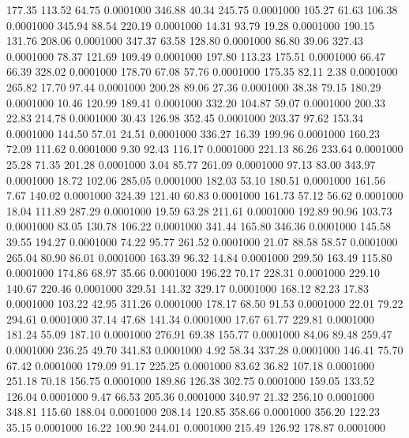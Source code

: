  177.35  113.52   64.75   0.0001000
 346.88   40.34  245.75   0.0001000
 105.27   61.63  106.38   0.0001000
 345.94   88.54  220.19   0.0001000
  14.31   93.79   19.28   0.0001000
 190.15  131.76  208.06   0.0001000
 347.37   63.58  128.80   0.0001000
  86.80   39.06  327.43   0.0001000
  78.37  121.69  109.49   0.0001000
 197.80  113.23  175.51   0.0001000
  66.47   66.39  328.02   0.0001000
 178.70   67.08   57.76   0.0001000
 175.35   82.11    2.38   0.0001000
 265.82   17.70   97.44   0.0001000
 200.28   89.06   27.36   0.0001000
  38.38   79.15  180.29   0.0001000
  10.46  120.99  189.41   0.0001000
 332.20  104.87   59.07   0.0001000
 200.33   22.83  214.78   0.0001000
  30.43  126.98  352.45   0.0001000
 203.37   97.62  153.34   0.0001000
 144.50   57.01   24.51   0.0001000
 336.27   16.39  199.96   0.0001000
 160.23   72.09  111.62   0.0001000
   9.30   92.43  116.17   0.0001000
 221.13   86.26  233.64   0.0001000
  25.28   71.35  201.28   0.0001000
   3.04   85.77  261.09   0.0001000
  97.13   83.00  343.97   0.0001000
  18.72  102.06  285.05   0.0001000
 182.03   53.10  180.51   0.0001000
 161.56    7.67  140.02   0.0001000
 324.39  121.40   60.83   0.0001000
 161.73   57.12   56.62   0.0001000
  18.04  111.89  287.29   0.0001000
  19.59   63.28  211.61   0.0001000
 192.89   90.96  103.73   0.0001000
  83.05  130.78  106.22   0.0001000
 341.44  165.80  346.36   0.0001000
 145.58   39.55  194.27   0.0001000
  74.22   95.77  261.52   0.0001000
  21.07   88.58   58.57   0.0001000
 265.04   80.90   86.01   0.0001000
 163.39   96.32   14.84   0.0001000
 299.50  163.49  115.80   0.0001000
 174.86   68.97   35.66   0.0001000
 196.22   70.17  228.31   0.0001000
 229.10  140.67  220.46   0.0001000
 329.51  141.32  329.17   0.0001000
 168.12   82.23   17.83   0.0001000
 103.22   42.95  311.26   0.0001000
 178.17   68.50   91.53   0.0001000
  22.01   79.22  294.61   0.0001000
  37.14   47.68  141.34   0.0001000
  17.67   61.77  229.81   0.0001000
 181.24   55.09  187.10   0.0001000
 276.91   69.38  155.77   0.0001000
  84.06   89.48  259.47   0.0001000
 236.25   49.70  341.83   0.0001000
   4.92   58.34  337.28   0.0001000
 146.41   75.70   67.42   0.0001000
 179.09   91.17  225.25   0.0001000
  83.62   36.82  107.18   0.0001000
 251.18   70.18  156.75   0.0001000
 189.86  126.38  302.75   0.0001000
 159.05  133.52  126.04   0.0001000
   9.47   66.53  205.36   0.0001000
 340.97   21.32  256.10   0.0001000
 348.81  115.60  188.04   0.0001000
 208.14  120.85  358.66   0.0001000
 356.20  122.23   35.15   0.0001000
  16.22  100.90  244.01   0.0001000
 215.49  126.92  178.87   0.0001000
